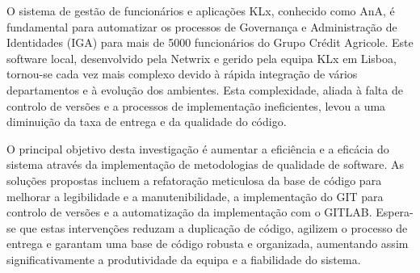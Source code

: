 
%

O sistema de gestão de funcionários e aplicações KLx, conhecido como AnA, é fundamental para automatizar os processos de Governança e Administração de Identidades (IGA) para mais de 5000 funcionários do Grupo Crédit Agricole. Este software local, desenvolvido pela Netwrix e gerido pela equipa KLx em Lisboa, tornou-se cada vez mais complexo devido à rápida integração de vários departamentos e à evolução dos ambientes. Esta complexidade, aliada à falta de controlo de versões e a processos de implementação ineficientes, levou a uma diminuição da taxa de entrega e da qualidade do código.

O principal objetivo desta investigação é aumentar a eficiência e a eficácia do sistema através da implementação de metodologias de qualidade de software. As soluções propostas incluem a refatoração meticulosa da base de código para melhorar a legibilidade e a manutenibilidade, a implementação do GIT para controlo de versões e a automatização da implementação com o GITLAB. Espera-se que estas intervenções reduzam a duplicação de código, agilizem o processo de entrega e garantam uma base de código robusta e organizada, aumentando assim significativamente a produtividade da equipa e a fiabilidade do sistema.

